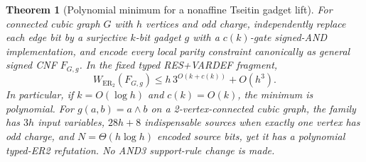 \documentclass[11pt]{article}
\newtheorem{theorem}{Theorem}
\begin{document}
\begin{theorem}[Polynomial minimum for a nonaffine Tseitin gadget lift]
For connected cubic graph $G$ with $h$ vertices and odd charge, independently replace each edge bit by a surjective $k$-bit gadget $g$ with a $c(k)$-gate signed-AND implementation, and encode every local parity constraint canonically as general signed CNF $F_{G,g}$. In the fixed typed RES+VARDEF fragment,
\[
W_{\mathrm{ER}_2}(F_{G,g})\le h\,3^{O(k+c(k))}+O(h^3).
\]
In particular, if $k=O(\log h)$ and $c(k)=O(k)$, the minimum is polynomial. For $g(a,b)=a\wedge b$ on a 2-vertex-connected cubic graph, the family has $3h$ input variables, $28h+8$ indispensable sources when exactly one vertex has odd charge, and $N=\Theta(h\log h)$ encoded source bits, yet it has a polynomial typed-ER2 refutation. No AND3 support-rule change is made.
\end{theorem}
\end{document}
